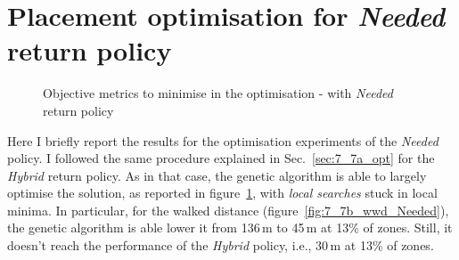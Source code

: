 \section{Placement optimisation for \textit{Needed} return policy}
\label{sec:7_7b_needed}

 
 \begin{figure}[h]
     \centering     %
     \caption{Objective metrics to minimise in the optimisation - with \textit{Needed} return policy}
    \label{fig:7_7b_optimized_metrics_needed}
 \end{figure}
 
Here I briefly report the results for the optimisation experiments of the \textit{Needed} policy.
I followed the same procedure explained in Sec.~\ref{sec:7_7a_opt} for the \textit{Hybrid} return policy. As in that case, the genetic algorithm is able to largely optimise the solution, as reported in figure~\ref{fig:7_7b_optimized_metrics_needed}, with \textit{local searches} stuck in local minima. 
In particular, for the walked distance (figure~\ref{fig:7_7b_wwd_Needed}), the genetic algorithm is able lower it from 136\,m to 45\,m at 13\% of zones. Still, it doesn't reach the performance of the \textit{Hybrid} policy, i.e., 30\,m at 13\% of zones.

